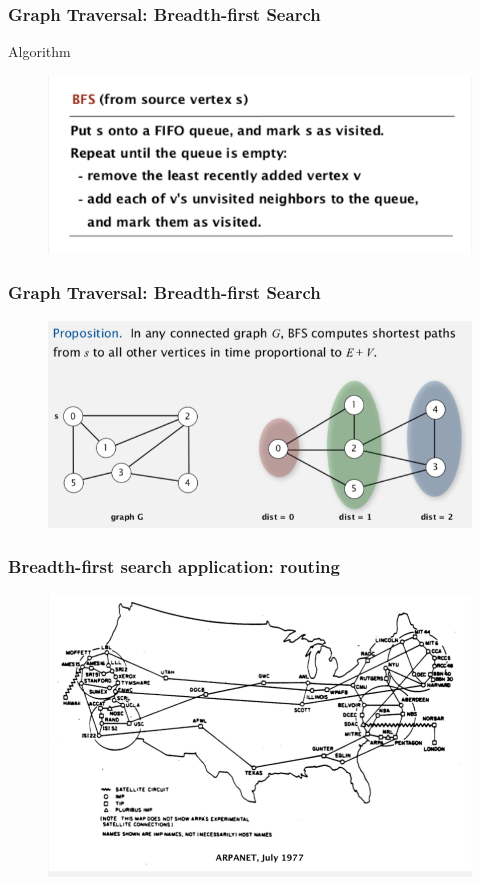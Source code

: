 \documentclass[11pt]{beamer}
\begin{document}
\begin{frame}
	\frametitle	{Graph Traversal: Breadth-first Search} 
    \alert{Algorithm}
    \begin{figure}
    	\centering
    	\includegraphics[width=0.9\linewidth]{"Screenshot 2020-12-01 at 11.13.02 AM"}
    	\label{fig:screenshot-2020-12-01-at-11}
    \end{figure}    
\end{frame}

\begin{frame}
	\frametitle	{Graph Traversal: Breadth-first Search} 
    \begin{figure}
    	\centering
    	\includegraphics[width=1\linewidth]{"Screenshot 2020-12-01 at 11.14.39 AM"}
    	\label{fig:screenshot-2020-12-01-at-11}
    \end{figure}      
\end{frame}

\begin{frame}
	\frametitle	{Breadth-first search application: routing} 
	  \begin{figure}
	  	\centering
	  	\includegraphics[width=0.9\linewidth]{"Screenshot 2020-12-01 at 11.22.42 AM"}
	  	\label{fig:screenshot-2020-12-01-at-11}
	  \end{figure}	  
\end{frame}
\end{document}
